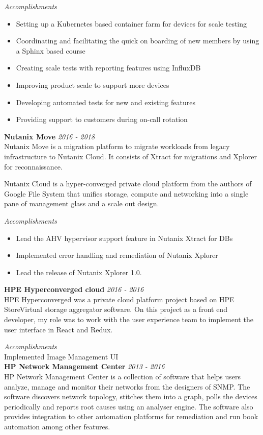\documentclass[line,margin]{res}
\begin{document}
\begin{resume}
{\it{Accomplishments}}\\
\begin{itemize}
\item Setting up a Kubernetes based container farm for devices for scale testing
\item Coordinating and facilitating the quick on boarding of new members by using a Sphinx based course
\item Creating scale tests with reporting features using InfluxDB
\item Improving product scale to support more devices
\item Developing automated tests for new and existing features
\item Providing support to customers during on-call rotation
\end{itemize}
{\bf Nutanix Move} \hfill {\it{2016 - 2018}}\\

Nutanix Move is a migration platform to migrate workloads from legacy infrastructure to Nutanix Cloud. It consists of Xtract for migrations and Xplorer for reconnaissance.

Nutanix Cloud is a hyper-converged private cloud platform from the authors of Google File System that unifies storage, compute and networking into a single pane of management glass and a scale out design. 

{\it{Accomplishments}}\\
\begin{itemize}
\item Lead the AHV hypervisor support feature in Nutanix Xtract for DBs
\item Implemented error handling and remediation of Nutanix Xplorer
\item Lead the release of Nutanix Xplorer 1.0.
\end{itemize}


{\bf HPE Hyperconverged cloud} \hfill {\it{2016 - 2016}}\\

HPE Hyperconverged was a private cloud platform project based on HPE StoreVirtual storage aggregator software. On this project as a front end developer, my role was to work with the user experience team to implement the user interface in React and Redux.

{\it{Accomplishments}}\\
Implemented Image Management UI\\

{\bf HP Network Management Center} \hfill {\it{2013 - 2016}}\\
HP Network Management Center is a collection of software that helps users analyze, manage and monitor their networks from the designers of SNMP. The software discovers network topology, stitches them into a graph, polls the devices periodically and reports root causes using an analyser engine. The software also provides integration to other automation platforms for remediation and run book automation among other features.


\end{resume}
\end{document}
